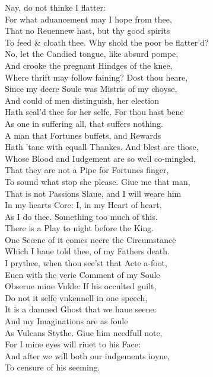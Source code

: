 \documentclass[a5paper,DIV=calc,11pt]{scrbook}
\begin{document}
\begin{drama*}
    \hamspeaks Nay, do not thinke I flatter:\\
    For what aduancement may I hope from thee,\\
    That no Reuennew hast, but thy good spirits\\
    To feed \& cloath thee. Why shold the poor be flatter'd?\\
    No, let the Candied tongue, like absurd pompe,\\
    And crooke the pregnant Hindges of the knee,\\
    Where thrift may follow faining? Dost thou heare,\\
    Since my deere Soule was Mistris of my choyse,\\
    And could of men distinguish, her election\\
    Hath seal'd thee for her selfe. For thou hast bene\\
    As one in suffering all, that suffers nothing.\\
    A man that Fortunes buffets, and Rewards\\
    Hath 'tane with equall Thankes. And blest are those,\\
    Whose Blood and Iudgement are so well co-mingled,\\
    That they are not a Pipe for Fortunes finger,\\
    To sound what stop she please. Giue me that man,\\
    That is not Passions Slaue, and I will weare him\\
    In my hearts Core: I, in my Heart of heart,\\
    As I do thee. Something too much of this.\\
    There is a Play to night before the King.\\
    One Scœne of it comes neere the Circumstance\\
    Which I haue told thee, of my Fathers death.\\
    I prythee, when thou see'st that Acte a-foot,\\
    Euen with the verie Comment of my Soule\\
    Obserue mine Vnkle: If his occulted guilt,\\
    Do not it selfe vnkennell in one speech,\\
    It is a damned Ghost that we haue seene:\\
    And my Imaginations are as foule\\
    As Vulcans Stythe. Giue him needfull note,\\
    For I mine eyes will riuet to his Face:\\
    And after we will both our iudgements ioyne,\\
    To censure of his seeming.
    

\end{drama*}
\end{document}
